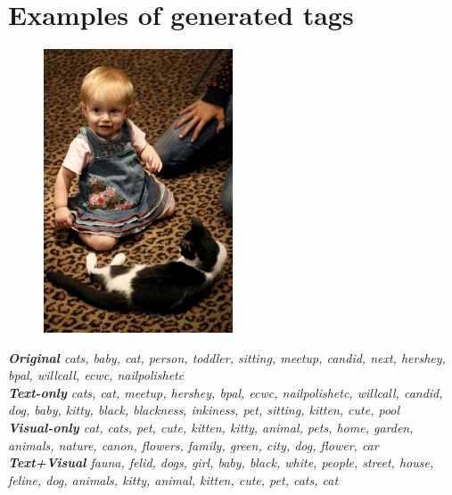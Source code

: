 \documentclass[12pt]{article}
\begin{document}
\section{Examples of generated tags}
\begin{figure}[H]
\includegraphics[width=0.5\textwidth]{examples/cat1.jpg}
\end{figure}

\emph{\textbf{Original} cats, baby, cat, person, toddler, sitting, meetup, candid, next, hershey, bpal, willcall, ecwc, nailpolishetc\\
\textbf{Text-only} cats, cat, meetup, hershey, bpal, ecwc, nailpolishetc, willcall, candid, dog, baby, kitty, black, blackness, inkiness, pet, sitting, kitten, cute, pool\\
\textbf{Visual-only} cat, cats, pet, cute, kitten, kitty, animal, pets, home, garden, animals, nature, canon, flowers, family, green, city, dog, flower, car\\
\textbf{Text+Visual} fauna, felid, dogs, girl, baby, black, white, people, street,
house, feline, dog, animals, kitty, animal, kitten, cute, pet, cats, cat}



\end{document}
